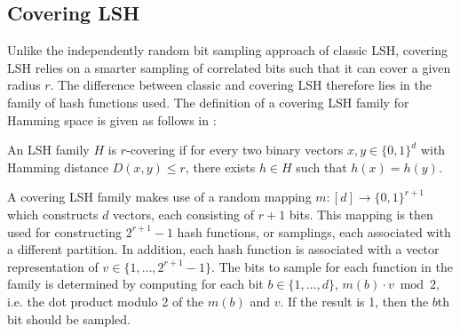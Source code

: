 \subsection{Covering LSH}
\label{background-covering-lsh}

Unlike the independently random bit sampling approach of classic LSH, covering LSH relies on a smarter sampling of correlated bits such that it can cover a given radius $r$. The difference between classic and covering LSH therefore lies in the family of hash functions used. The definition of a covering LSH family for Hamming space is given as follows in \cite{DBLP:journals/corr/PhamP16}:

\begin{definition}
\label{definition-covering-family}
  An LSH family $H$ is $r$-covering if for every two binary vectors $x, y \in \{0, 1\}^d$ with Hamming distance $D(x, y) \leq r$, there exists $h \in H$ such that $h(x) = h(y)$.
\end{definition}

A covering LSH family makes use of a random mapping $m \colon [d] \rightarrow \{0, 1\}^{r + 1}$ which constructs $d$ vectors, each consisting of $r + 1$ bits. This mapping is then used for constructing $2^{r + 1} - 1$ hash functions, or samplings, each associated with a different partition. In addition, each hash function is associated with a vector representation of $v \in \{1, \ldots, 2^{r + 1} - 1\}$. The bits to sample for each function in the family is determined by computing for each bit $b \in \{1, \ldots, d\}$, $m(b) \cdot v \bmod 2$, i.e. the dot product modulo 2 of the $m(b)$ and $v$. If the result is 1, then the $b$th bit should be sampled.

